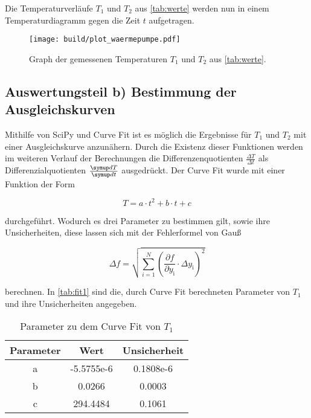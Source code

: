Die Temperaturverläufe $T_1$ und $T_2$ aus \autoref{tab:werte} werden nun in einem Temperaturdiagramm gegen die Zeit $t$ aufgetragen.

\begin{figure}
    \centering
    \texttt{[image: build/plot\_waermepumpe.pdf]}
    \caption{Graph der gemessenen Temperaturen $T_1$ und $T_2$ aus \autoref{tab:werte}.\cite{numpy}}
    \label{fig:waermepumpe_plot}
\end{figure}

\subsection{Auswertungsteil b) Bestimmung der Ausgleichskurven}
\label{ssec:b} 
Mithilfe von SciPy und Curve Fit ist es möglich die Ergebnisse für $T_1$ und $T_2$ mit einer Ausgleichskurve anzunähern. 
Durch die Existenz dieser Funktionen werden im weiteren Verlauf der Berechnungen die Differenzenquotienten $\frac{\Delta T}{\Delta t}$ als Differenzialquotienten $\frac{\dif{T}}{\dif{t}}$ ausgedrückt.
Der Curve Fit wurde mit einer Funktion der Form

\begin{equation}
    T = a \cdot t^2 + b \cdot t + c
    \label{eq:curvefit}
\end{equation}

durchgeführt. Wodurch es drei Parameter zu bestimmen gilt, sowie ihre Unsicherheiten, diese lassen sich mit der Fehlerformel von Gauß

\begin{equation}
    \Delta f = \sqrt{\sum_{i=1}^N \left(\frac{\partial{f}}{\partial{y_\text{i}}} \cdot \Delta y_\text{i} \right)^2}
    \label{eq:gauß}
\end{equation}

berechnen. In \autoref{tab:fit1} sind die, durch Curve Fit berechneten Parameter von $T_1$ und ihre Unsicherheiten angegeben. 

\begin{table}
    \centering
    \begin{tabular}{c S[table-format=1.4e-1] S[table-format=1.4e-1]}
        \toprule
        Parameter & {Wert} & {Unsicherheit} \\
        \midrule
        a & -5.5755e-6 & 0.1808e-6 \\
        b & 0.0266 & 0.0003 \\
        c & 294.4484 & 0.1061 \\
        \bottomrule
    \end{tabular}
    \caption{Parameter zu dem Curve Fit von $T_1$}
    \label{tab:fit1}
\end{table}

